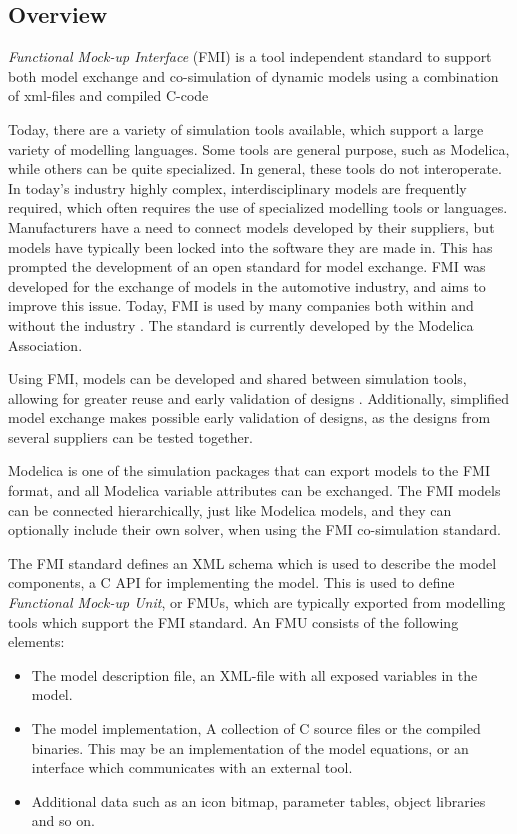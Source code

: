 \documentclass[\rootfolder/main.tex]{subfiles}
\begin{document}
\subsection{Overview}

\begin{displayquote} \emph{Functional Mock-up Interface} (FMI) is a tool independent standard to support both model exchange and co-simulation of dynamic models using a combination of xml-files and compiled C-code
\end{displayquote}

Today, there are a variety of simulation tools available, which support a large variety of modelling languages.
Some tools are general purpose, such as Modelica, while others can be quite specialized.
In general, these tools do not interoperate.
In today's industry highly complex, interdisciplinary models are frequently required, which often requires the use of specialized modelling tools or languages.
Manufacturers have a need to connect models developed by their suppliers, but models have typically been locked into the software they are made in.  This has prompted the development of an open standard for model exchange.
FMI was developed for the exchange of models in the automotive industry, and aims to improve this issue.
Today, FMI is used by many companies both within and without the industry \cite{fmispecification}.
The standard is currently developed by the Modelica Association.

Using FMI, models can be developed and shared between simulation tools, allowing for greater reuse and early validation of designs \cite{Blochwitz2011}.
Additionally, simplified model exchange makes possible early validation of designs, as the designs from several suppliers can be tested together.

Modelica is one of the simulation packages that can export models to the FMI format, and all Modelica variable attributes can be exchanged.
The FMI models can be connected hierarchically, just like Modelica models, and they can optionally include their own solver, when using the FMI co-simulation standard.

The FMI standard defines an XML schema which is used to describe the model components, a C API for implementing the model.
This is used to define \emph{Functional Mock-up Unit}, or FMUs, which are typically exported from modelling tools which support the FMI standard.
An FMU consists of the following elements:

\begin{itemize}
    \item The model description file, an XML-file with all exposed variables in the model.
    \item The model implementation, A collection of C source files or the compiled binaries.
        This may be an implementation of the model equations, or an interface which communicates with an external tool.
    \item Additional data such as an icon bitmap, parameter tables, object libraries and so on.
\end{itemize}
\end{document}
